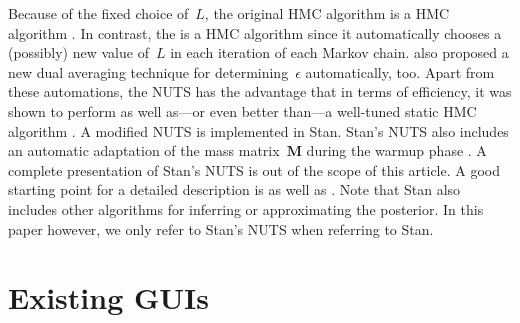 Because of the fixed choice of~$L$, the original HMC algorithm is a
 HMC algorithm \citep{betancourt_conceptual_2018}. In
contrast, the 
\citep{hoffman_no-u-turn_2014} is a  HMC algorithm since it
automatically chooses a (possibly) new value of~$L$ in each iteration of each
Markov chain. \citet{hoffman_no-u-turn_2014} also proposed a new dual
averaging technique for determining~$\epsilon$ automatically, too. Apart from
these automations, the NUTS has the advantage that in terms of efficiency, it
was shown to perform as well as---or even better than---a well-tuned static
HMC algorithm \citep{hoffman_no-u-turn_2014}. A modified
\citep{betancourt_conceptual_2018} NUTS
is implemented in Stan. Stan's
NUTS also includes an automatic adaptation of the mass matrix~$\boldsymbol{M}$
during the warmup phase \citep{stan_development_team_reference_2022}. A complete
presentation of Stan's NUTS is out of the scope of this article. A good
starting point for a detailed description is
\citet{stan_development_team_reference_2022} as well as
\citet{betancourt_conceptual_2018}. Note that Stan also includes other
algorithms for inferring or approximating the posterior. In this paper
however, we only refer to Stan's NUTS when referring to Stan.

\section{Existing GUIs}
\label{GUIs}

